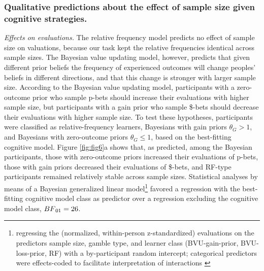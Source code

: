 \documentclass[a4paper, man, floatsintext]{apa6}
\title{}
\author{Jana B. Jarecki}
\date{20 November, 2019}
\let\rmarkdownfootnote\footnote%
\def\footnote{\protect\rmarkdownfootnote}
\begin{document}
\subsubsection{Qualitative predictions about the effect of sample size given cognitive strategies.}

\textit{Effects on evaluations.} The relative frequency model predicts
no effect of sample size on valuations, because our task kept the
relative frequencies identical across sample sizes. The Bayesian value
updating model, however, predicts that given different prior beliefs the
frequency of experienced outcomes will change peoples' beliefs in
different directions, and that this change is stronger with larger
sample size. According to the Bayesian value updating model,
participants with a zero-outcome prior who sample p-bets should increase
their evaluations with higher sample size, but participants with a gain
prior who sample \$-bets should decrease their evaluations with higher
sample size. To test these hypotheses, participants were classified as
relative-frequency learners, Bayesians with gain priors
\(\theta_G > 1\), and Bayesians with zero-outcome priors
\(\theta_G \leq 1\), based on the best-fitting cognitive model. Figure
\ref{fig:fig6}a shows that, as predicted, among the Bayesian
participants, those with zero-outcome priors increased their evaluations
of p-bets, those with gain priors decreased their evaluations of
\$-bets, and RF-type participants remained relatively stable across
sample sizes. Statistical analyses by means of a Bayesian generalized
linear
model\footnote{regressing the (normalized, within-person z-standardized) evaluations on the predictors sample size, gamble type, and learner class (BVU-gain-prior, BVU-loss-prior, RF) with a by-participant random intercept; categorical predictors were effects-coded to facilitate interpretation of interactions \citep[for details, see][]{SingmannForthcoming}}
favored a regression with the best-fitting cognitive model class as
predictor over a regression excluding the cognitive model class,
\(BF\textsubscript{01}=26\).
\end{document}
